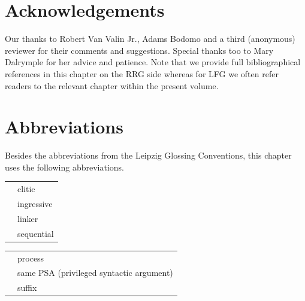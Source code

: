 \documentclass[output=paper,hidelinks]{langscibook}
\begin{document}
\section*{Acknowledgements}

Our thanks to Robert Van Valin Jr., Adams Bodomo and a third (anonymous) reviewer for their comments and suggestions. Special thanks too to Mary Dalrymple for her advice and patience. Note that we provide full bibliographical references in this chapter on the RRG side whereas for LFG we often refer readers to the relevant chapter within the present volume.

\section*{Abbreviations}

Besides the abbreviations from the Leipzig Glossing Conventions, this
chapter uses the following abbreviations.\medskip

\noindent\begin{tabularx}{.45\textwidth}{lQ}
 & clitic\\
 & ingressive\\
 & linker\\
 & sequential\\
\end{tabularx}
\begin{tabularx}{.45\textwidth}{lQ}
 & process\\
   & same PSA (privileged syntactic argument)\\
 & suffix\\
\end{tabularx}

\sloppy
\printbibliography[heading=subbibliography,notkeyword=this]
\end{document}
